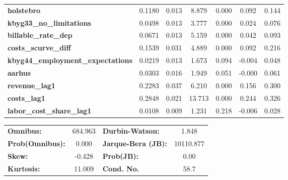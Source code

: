 \begin{center}
\begin{tabular}{lcccccc}
\textbf{holstebro}                        &       0.1180  &        0.013     &     8.879  &         0.000        &        0.092    &        0.144     \\
\textbf{kbyg33\_no\_limitations}          &       0.0498  &        0.013     &     3.777  &         0.000        &        0.024    &        0.076     \\
\textbf{billable\_rate\_dep}              &       0.0671  &        0.013     &     5.159  &         0.000        &        0.042    &        0.093     \\
\textbf{costs\_scurve\_diff}              &       0.1539  &        0.031     &     4.889  &         0.000        &        0.092    &        0.216     \\
\textbf{kbyg44\_employment\_expectations} &       0.0219  &        0.013     &     1.673  &         0.094        &       -0.004    &        0.048     \\
\textbf{aarhus}                           &       0.0303  &        0.016     &     1.949  &         0.051        &       -0.000    &        0.061     \\
\textbf{revenue\_lag1}                    &       0.2283  &        0.037     &     6.210  &         0.000        &        0.156    &        0.300     \\
\textbf{costs\_lag1}                      &       0.2848  &        0.021     &    13.713  &         0.000        &        0.244    &        0.326     \\
\textbf{labor\_cost\_share\_lag1}         &       0.0108  &        0.009     &     1.231  &         0.218        &       -0.006    &        0.028     \\
\bottomrule
\end{tabular}
\begin{tabular}{lclc}
\textbf{Omnibus:}       & 684.963 & \textbf{  Durbin-Watson:     } &     1.848  \\
\textbf{Prob(Omnibus):} &   0.000 & \textbf{  Jarque-Bera (JB):  } & 10110.877  \\
\textbf{Skew:}          &  -0.428 & \textbf{  Prob(JB):          } &      0.00  \\
\textbf{Kurtosis:}      &  11.009 & \textbf{  Cond. No.          } &      58.7  \\
\bottomrule
\end{tabular}
\end{center}